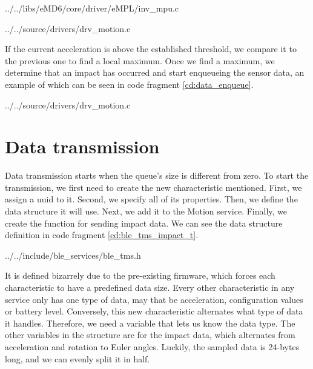 
{../../libs/eMD6/core/driver/eMPL/inv_mpu.c}


{../../source/drivers/drv_motion.c}

If the current acceleration is above the established threshold, we compare it to the previous one to find a local maximum. Once we find a maximum, we determine that an impact has occurred and start enqueueing the sensor data, an example of which can be seen in code fragment \ref{cd:data_enqueue}.


{../../source/drivers/drv_motion.c}

\section{Data transmission}

Data transmission starts when the queue's size is different from zero. To start the transmission, we first need to create the new characteristic mentioned. First, we assign a \gls{uuid} to it. Second, we specify all of its properties. Then, we define the data structure it will use. Next, we add it to the Motion service. Finally, we create the function for sending impact data. We can see the data structure definition in code fragment \ref{cd:ble_tms_impact_t}. 


{../../include/ble_services/ble_tms.h}

It is defined bizarrely due to the pre-existing firmware, which forces each characteristic to have a predefined data size. Every other characteristic in any service only has one type of data, may that be acceleration, configuration values or battery level. Conversely, this new characteristic alternates what type of data it handles. Therefore, we need a variable that lets us know the data type. The other variables in the structure are for the impact data, which alternates from acceleration and rotation to Euler angles. Luckily, the sampled data is 24-bytes long, and we can evenly split it in half.

